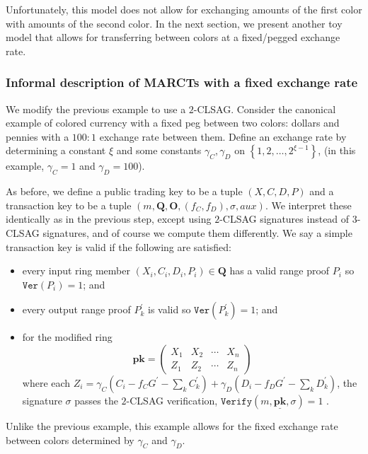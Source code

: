 \documentclass{mrl}
\theoremstyle{plain}
\theoremstyle{definition}
\begin{document}
Unfortunately, this model does not allow for exchanging amounts of the first color with amounts of the second color. In the next section, we present another toy model that allows for transferring between colors at a fixed/pegged exchange rate.


\subsubsection{Informal description of MARCTs with a fixed exchange rate}\label{ex:dualasset}
We modify the previous example to use a $2$-CLSAG. Consider the canonical example of colored currency with a fixed peg between two colors: dollars and pennies with a $100:1$ exchange rate between them. Define an exchange rate by determining a constant $\xi$ and some constants $\gamma_C, \gamma_D$ on $\left\{1, 2, \ldots, 2^{\xi - 1}\right\}$, (in this example, $\gamma_C = 1$ and $\gamma_D = 100$). 

As before, we define a public trading key to be a tuple $(X, C, D, P)$ and a transaction key to be a tuple $(m, \textbf{Q}, \textbf{O}, (f_C, f_D), \sigma, \textit{aux})$. We interpret these identically as in the previous step, except using $2$-CLSAG signatures instead of $3$-CLSAG signatures, and of course we compute them differently. We say a simple transaction key is valid if the following are satisfied:
\begin{itemize}
\item every input ring member $(X_i, C_i, D_i, P_i) \in \textbf{Q}$ has a valid range proof $P_i$ so $\texttt{Ver}(P_i) = 1$; and
\item every output range proof $P_k^\prime$ is valid so $\texttt{Ver}(P_k^\prime)=1$; and
\item for the modified ring \[\textbf{pk} = \begin{pmatrix} X_1 & X_2 & \cdots & X_n \\ Z_1 & Z_2 & \cdots & Z_n\end{pmatrix}\] where each $Z_i = \gamma_C (C_i - f_C G^\prime - \sum_k C_k^\prime) + \gamma_D ( D_i - f_D G^\prime - \sum_k D_k^\prime)$, the signature $\sigma$ passes the $2$-CLSAG verification, $\texttt{Verify}(m, \underline{\textbf{pk}}, \sigma) = 1$ .
\end{itemize}

Unlike the previous example, this example allows for the fixed exchange rate between colors determined by $\gamma_C$ and $\gamma_D$.


\appendix
\end{document}
